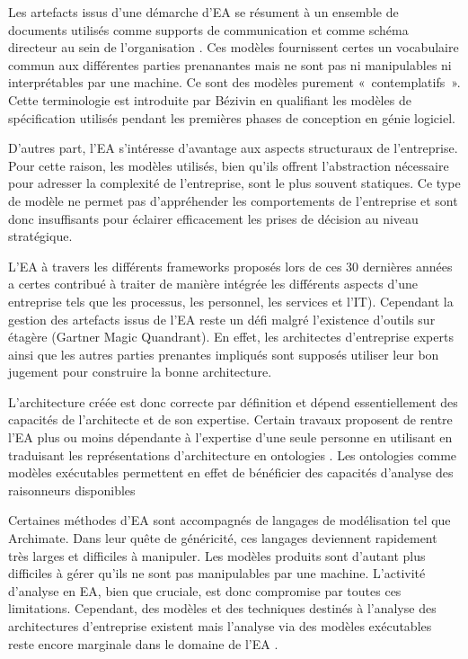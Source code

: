 Les artefacts issus d'une démarche d'EA se résument à un ensemble de documents utilisés comme supports de communication et comme schéma directeur au sein de l'organisation \cite{kulkarni_modelling_2013} \cite{clark_towards_2014}. Ces modèles fournissent certes un vocabulaire commun aux différentes parties prenanantes mais ne sont pas ni manipulables ni interprétables par une machine. Ce sont des modèles purement «~contemplatifs~». Cette terminologie est introduite par Bézivin en qualifiant les modèles de spécification utilisés pendant les premières phases de conception en génie logiciel. 

D'autres part, l'EA s'intéresse d'avantage aux aspects structuraux de l'entreprise. Pour cette raison, les modèles utilisés, bien qu'ils offrent l'abstraction nécessaire pour adresser la complexité de l'entreprise, sont le plus souvent statiques. Ce type de modèle ne permet pas d'appréhender les comportements de l'entreprise et sont donc insuffisants pour éclairer efficacement les prises de décision au niveau stratégique.

L'EA à travers les différents frameworks proposés lors de ces 30 dernières années a certes contribué à traiter de manière intégrée les différents aspects d'une entreprise tels que les processus, les personnel, les services et l'IT). Cependant la gestion des artefacts issus de l'EA reste un défi \cite{zachman1997enterprise} malgré l'existence d'outils sur étagère (Gartner Magic Quandrant). En effet, les architectes d'entreprise experts ainsi que les autres parties prenantes impliqués sont supposés utiliser leur bon jugement pour construire la bonne architecture. 

L'architecture créée est donc correcte par définition et dépend essentiellement des capacités de l'architecte et de son expertise. Certain travaux proposent de rentre l'EA plus ou moins dépendante à l'expertise d'une seule personne en utilisant en traduisant les représentations d'architecture en ontologies \cite{sunkle_analyzing_2013}. Les ontologies comme modèles exécutables permettent en effet de bénéficier des capacités d'analyse des raisonneurs disponibles 

Certaines méthodes d'EA sont accompagnés de langages de modélisation tel que Archimate. Dans leur quête de généricité, ces langages deviennent rapidement très larges et difficiles à manipuler. Les modèles produits sont d'autant plus difficiles à gérer qu'ils ne sont pas manipulables par une machine. L'activité d'analyse en EA, bien que cruciale, est donc compromise par toutes ces limitations. Cependant, des modèles et des techniques destinés à l'analyse des architectures d'entreprise existent mais l'analyse via des modèles exécutables reste encore marginale dans le domaine de l'EA \cite{kulkarni2013modelling}. 

